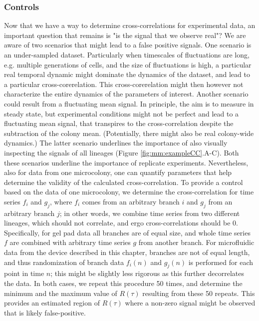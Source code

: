 {\subsubsection{Controls}

Now that we have a way to determine cross-correlations for experimental data,
an important question that remains is "is the signal that we observe real"?
%
We are aware of two scenarios that might lead to a false positive signals.
%
One scenario is an under-sampled dataset. 
Particularly when timescales of fluctuations are long, e.g. multiple generations of cells, and the size of fluctuations is high, 
a particular real temporal dynamic might dominate the dynamics of the dataset,
and lead to a particular cross-corerelation.
%
This cross-corerelation might then however not 
characterize
the entire dynamics of the parameters of interest.
% 
Another scenario could result from a fluctuating mean signal.
%
In principle, the aim is to measure in steady state, but experimental conditions might not be perfect and lead to a fluctuating mean signal, 
that transpires to the cross-correlation despite the subtraction of the colony mean.
%
(Potentially, there might also be real colony-wide dynamics.)
%
The latter scenario underlines the importance of also visually inspecting the signals of all lineages (Figure \ref{fig:mm:exampleCC}.A-C).
%
Both these scenarios underline the importance of replicate experiments.
%
Nevertheless, also for data from one microcolony, one can quantify parameters that help determine the validity of the calculated cross-correlation.
%
To provide a control 
based on the data of one microcolony, we determine the cross-correlation for time series $f_i$ and $g_j$, where $f_i$ comes from an arbitrary branch $i$ and $g_j$ from an arbitrary branch $j$; 
in other words, we combine time series from two different lineages, which should not correlate, and ergo cross-correlations should be 0.
%
Specifically, for gel pad data all branches are of equal size, and whole time series $f$ are combined with arbitrary time series $g$ from another branch.
%
For microfluidic data from the device described in this chapter, branches are not of equal length, and thus randomization of branch data $f_i(n)$ and $g_j(n)$ is performed for each point in time $n$; this might be slightly less rigorous as this further decorrelates the data.
%
In both cases, we repeat this procedure 50 times, and determine the minimum and the maximum value of $R(\tau)$ resulting from these 50 repeats. 
%
This provides an estimated region of $R(\tau)$ where a non-zero signal might be observed that is likely false-positive.

}
